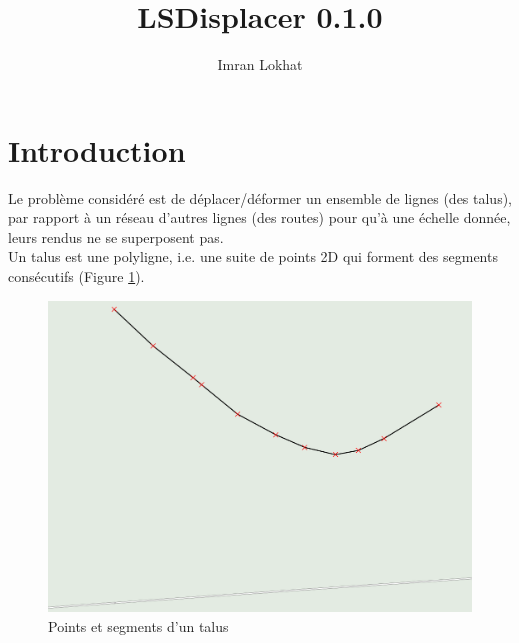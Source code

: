 \documentclass[11pt]{article}
\title{\textbf{LSDisplacer 0.1.0}}
\author{Imran Lokhat}
\date{}
\begin{document}
\maketitle
\thispagestyle{empty}

\section{Introduction}
Le problème considéré est de déplacer/déformer un ensemble de lignes (des talus), par rapport à un réseau d'autres lignes (des routes) pour qu'à une échelle donnée, leurs rendus ne se superposent pas.\\
Un talus est une polyligne, i.e. une suite de points 2D qui forment des segments consécutifs (Figure \ref{points_segments}).\\

\begin{figure}[htp]
	\centering
	\includegraphics[scale=0.30]{points_segments.png}
	\caption{Points et segments d'un talus}
	\label{points_segments}
\end{figure}
\end{document}
